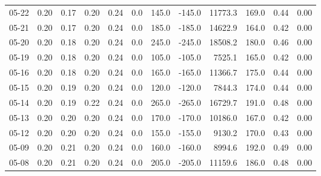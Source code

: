\begin{threeparttable}
{\begin{tabular}{lrrrrrrrrrrr}
  05-22 &          0.20 &          0.17 &          0.20 &        0.24 &                 0.0 &               145.0 &     -145.0 &             11773.3 &            169.0 &            0.44 &                   0.00 \\
  05-21 &          0.20 &          0.17 &          0.20 &        0.24 &                 0.0 &               185.0 &     -185.0 &             14622.9 &            164.0 &            0.42 &                   0.00 \\
  05-20 &          0.20 &          0.18 &          0.20 &        0.24 &                 0.0 &               245.0 &     -245.0 &             18508.2 &            180.0 &            0.46 &                   0.00 \\
  05-19 &          0.20 &          0.18 &          0.20 &        0.24 &                 0.0 &               105.0 &     -105.0 &              7525.1 &            165.0 &            0.42 &                   0.00 \\
  05-16 &          0.20 &          0.18 &          0.20 &        0.24 &                 0.0 &               165.0 &     -165.0 &             11366.7 &            175.0 &            0.44 &                   0.00 \\
  05-15 &          0.20 &          0.19 &          0.20 &        0.24 &                 0.0 &               120.0 &     -120.0 &              7844.3 &            174.0 &            0.44 &                   0.00 \\
  05-14 &          0.20 &          0.19 &          0.22 &        0.24 &                 0.0 &               265.0 &     -265.0 &             16729.7 &            191.0 &            0.48 &                   0.00 \\
  05-13 &          0.20 &          0.20 &          0.20 &        0.24 &                 0.0 &               170.0 &     -170.0 &             10186.0 &            167.0 &            0.42 &                   0.00 \\
  05-12 &          0.20 &          0.20 &          0.20 &        0.24 &                 0.0 &               155.0 &     -155.0 &              9130.2 &            170.0 &            0.43 &                   0.00 \\
  05-09 &          0.20 &          0.21 &          0.20 &        0.24 &                 0.0 &               160.0 &     -160.0 &              8994.6 &            192.0 &            0.49 &                   0.00 \\
  05-08 &          0.20 &          0.21 &          0.20 &        0.24 &                 0.0 &               205.0 &     -205.0 &             11159.6 &            186.0 &            0.48 &                   0.00 \\

\end{tabular}}
\end{threeparttable}
